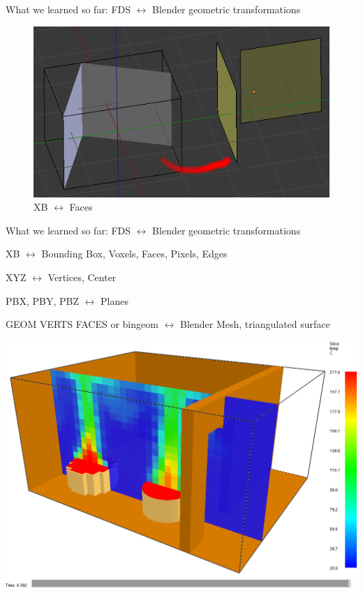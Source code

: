 \documentclass[aspectratio=169]{beamer}
\begin{document}
\begin{frame}[fragile]{What we learned so far: \linebreak FDS $\leftrightarrow$ Blender geometric transformations}
\begin{figure}[H]
\begin{columns}[T]
\begin{column}{.3\linewidth}
                \includegraphics[width=\linewidth]{images/T_FACES.png}
                \caption{XB $\leftrightarrow$ Faces}
            \end{column}
        \end{columns}
    \end{figure}
\end{frame}

\begin{frame}[fragile]{What we learned so far: \linebreak FDS $\leftrightarrow$ Blender geometric transformations}
    \begin{vfilleditems}
        \item XB $\leftrightarrow$ Bounding Box, Voxels, Faces, Pixels, Edges
        \item XYZ $\leftrightarrow$ Vertices, Center
        \item PBX, PBY, PBZ $\leftrightarrow$ Planes
        \item GEOM VERTS FACES or bingeom $\leftrightarrow$ Blender Mesh, triangulated surface
    \end{vfilleditems}
\end{frame}

\begin{frame}
  \centering
  \vfill
  \includegraphics[width=\linewidth]{images/smv_case.png}
  \vfill
\end{frame}
\end{document}
